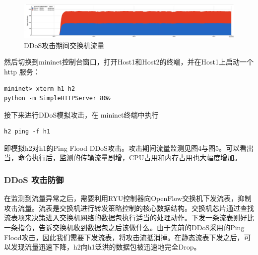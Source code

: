 \begin{figure}[H]
	\centering
	\includegraphics[width=0.9\linewidth]{pics/screenshot017}
	\caption{DDoS攻击期间交换机流量}
	\label{fig:screenshot017}
\end{figure}

\begin{figure}[H]
	\centering
	\quad
\end{figure}
\begin{multicols}{2}
	
然后切换到mininet控制台窗口，打开Host1和Host2的终端，并在Host1上启动一个 http 服务：
\begin{lstlisting}
mininet> xterm h1 h2
python -m SimpleHTTPServer 80&
\end{lstlisting}
接下来进行DDoS模拟攻击，在 mininet终端中执行
\begin{lstlisting}
h2 ping -f h1
\end{lstlisting}
即模拟h2对h1的Ping Flood DDoS攻击。攻击期间流量监测见图4与图5。可以看出当，命令执行后，监测的传输流量剧增，CPU占用和内存占用也大幅度增加。
\subsubsection{DDoS 攻击防御}
在监测到流量异常之后，需要利用RYU控制器向OpenFlow交换机下发流表，抑制攻击流量。流表是交换机进行转发策略控制的核心数据结构。交换机芯片通过查找流表项来决策进入交换机网络的数据包执行适当的处理动作。下发一条流表则好比一条指令，告诉交换机收到数据包之后该做什么。由于先前的DDoS采用的Ping Flood攻击，因此我们需要下发流表，将攻击流抵消掉。在静态流表下发之后，可以发现流量迅速下降，h2向h1泛洪的数据包被迅速地完全Drop。
\end{multicols}

